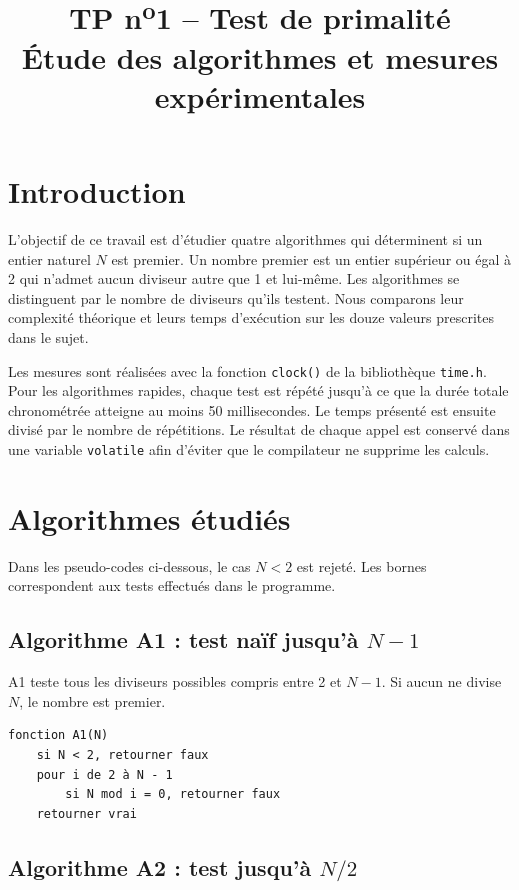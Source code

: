 \documentclass[11pt,a4paper]{article}
\title{TP n\textsuperscript{o}1 -- Test de primalité\\\large Étude des algorithmes et mesures expérimentales}
\author{}
\date{}
\begin{document}
\maketitle
\tableofcontents
\clearpage

\section{Introduction}

L'objectif de ce travail est d'étudier quatre algorithmes qui déterminent si un entier naturel $N$ est premier. Un nombre premier est un entier supérieur ou égal à 2 qui n'admet aucun diviseur autre que 1 et lui-même. Les algorithmes se distinguent par le nombre de diviseurs qu'ils testent. Nous comparons leur complexité théorique et leurs temps d'exécution sur les douze valeurs prescrites dans le sujet.

Les mesures sont réalisées avec la fonction \texttt{clock()} de la bibliothèque \texttt{time.h}. Pour les algorithmes rapides, chaque test est répété jusqu'à ce que la durée totale chronométrée atteigne au moins 50 millisecondes. Le temps présenté est ensuite divisé par le nombre de répétitions. Le résultat de chaque appel est conservé dans une variable \texttt{volatile} afin d'éviter que le compilateur ne supprime les calculs.

\section{Algorithmes étudiés}

Dans les pseudo-codes ci-dessous, le cas $N<2$ est rejeté. Les bornes correspondent aux tests effectués dans le programme.

\subsection{Algorithme A1 : test naïf jusqu'à $N-1$}

A1 teste tous les diviseurs possibles compris entre 2 et $N-1$. Si aucun ne divise $N$, le nombre est premier.

\begin{verbatim}
fonction A1(N)
    si N < 2, retourner faux
    pour i de 2 à N - 1
        si N mod i = 0, retourner faux
    retourner vrai
\end{verbatim}

\subsection{Algorithme A2 : test jusqu'à $N/2$}
\end{document}
